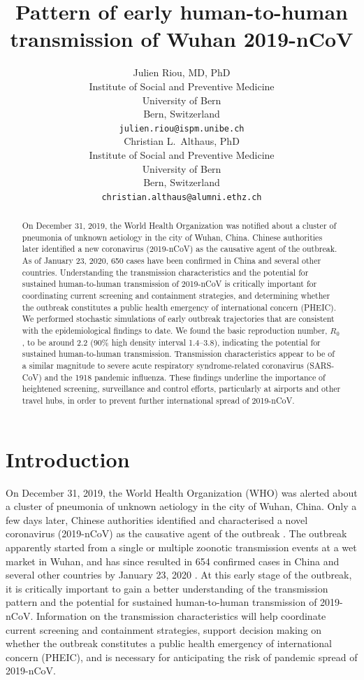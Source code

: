 \documentclass{article}
\title{Pattern of early human-to-human transmission of Wuhan 2019-nCoV}
\author{
   Julien Riou, MD, PhD \\
  Institute of Social and Preventive Medicine\\
  University of Bern\\
  Bern, Switzerland \\
  \texttt{julien.riou@ispm.unibe.ch} \\
  \And
Christian L.~Althaus, PhD \\
Institute of Social and Preventive Medicine\\
University of Bern\\
Bern, Switzerland \\
\texttt{christian.althaus@alumni.ethz.ch}
}
\begin{document}
\maketitle

\begin{abstract}
On December 31, 2019, the World Health Organization was notified about a cluster of pneumonia of unknown aetiology in the city of Wuhan, China. Chinese authorities later identified a new coronavirus (2019-nCoV) as the causative agent of the outbreak. As of January 23, 2020, 650 cases have been confirmed in China and several other countries. Understanding the transmission characteristics and the potential for sustained human-to-human transmission of 2019-nCoV is critically important for coordinating current screening and containment strategies, and determining whether the outbreak constitutes a public health emergency of international concern (PHEIC). We performed stochastic simulations of early outbreak trajectories that are consistent with the epidemiological findings to date. We found the basic reproduction number, $R_0$, to be around 2.2 (90\% high density interval 1.4--3.8), indicating the potential for sustained human-to-human transmission. Transmission characteristics appear to be of a similar magnitude to severe acute respiratory syndrome-related coronavirus (SARS-CoV) and the 1918 pandemic influenza. These findings underline the importance of heightened screening, surveillance and control efforts, particularly at airports and other travel hubs, in order to prevent further international spread of 2019-nCoV.
\end{abstract}

\section*{Introduction}

On December 31, 2019, the World Health Organization (WHO) was alerted about a cluster of pneumonia of unknown aetiology in the city of Wuhan, China\cite{who1}. Only a few days later, Chinese authorities identified and characterised a novel coronavirus (2019-nCoV) as the causative agent of the outbreak \cite{Shi:2020}. The outbreak apparently started from a single or multiple zoonotic transmission events at a wet market in Wuhan, and has since resulted in 654 confirmed cases in China and several other countries by January 23, 2020 \cite{wiki}. At this early stage of the outbreak, it is critically important to gain a better understanding of the transmission pattern and the potential for sustained human-to-human transmission of 2019-nCoV. Information on the transmission characteristics will help coordinate current screening and containment strategies, support decision making on whether the outbreak constitutes a public health emergency of international concern (PHEIC), and is necessary for anticipating the risk of pandemic spread of 2019-nCoV.
\end{document}
